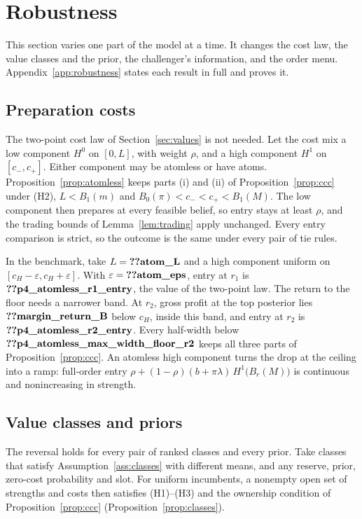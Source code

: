 \section{Robustness}\label{sec:robustness}

This section varies one part of the model at a time. It changes the cost law, the value classes and the prior, the
challenger's information, and the order menu. Appendix~\ref{app:robustness} states each result in full and
proves it.

\subsection{Preparation costs}\label{sec:costs}

The two-point cost law of Section~\ref{sec:values} is not needed. Let the cost mix a low component \(H^0\) on
\([0,L]\), with weight \(\rho\), and a high component \(H^1\) on \([c_-,c_+]\). Either component may be atomless or
have atoms. Proposition~\ref{prop:atomless} keeps parts (i) and (ii) of Proposition~\ref{prop:ccc} under (H2),
\(L<B_1(m)\) and \(B_0(\pi)<c_-<c_+<B_1(M)\). The low component then prepares at every feasible belief, so entry stays
at least \(\rho\), and the trading bounds of Lemma~\ref{lem:trading} apply unchanged. Every entry comparison is
strict, so the outcome is the same under every pair of tie rules.

In the benchmark, take \(L=\reg{atom_L}\) and a high component uniform on \([c_H-\varepsilon,c_H+\varepsilon]\). With
\(\varepsilon=\reg{atom_eps}\), entry at \(r_1\) is \(\reg{p4_atomless_r1_entry}\), the value of the two-point law. The
return to the floor needs a narrower band. At \(r_2\), gross profit at the top posterior lies \(\reg{margin_return_B}\)
below \(c_H\), inside this band, and entry at \(r_2\) is \(\reg{p4_atomless_r2_entry}\). Every half-width below
\(\reg{p4_atomless_max_width_floor_r2}\) keeps all three parts of Proposition~\ref{prop:ccc}. An atomless high
component turns the drop at the ceiling into a ramp: full-order entry
\(\rho+(1-\rho)(b+\pi\lambda)\,H^1\bigl(B_r(M)\bigr)\) is continuous and nonincreasing in strength.

\subsection{Value classes and priors}\label{sec:classes}

The reversal holds for every pair of ranked classes and every prior. Take classes that satisfy
Assumption~\ref{ass:classes} with different means, and any reserve, prior, zero-cost probability and slot. For uniform
incumbents, a nonempty open set of strengths and costs then satisfies (H1)--(H3) and the ownership condition of
Proposition~\ref{prop:ccc} (Proposition~\ref{prop:classes}).

